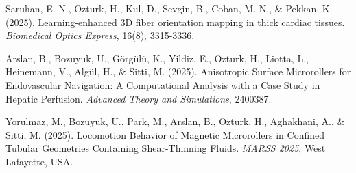 \documentclass{article}
\begin{document}
Saruhan, E. N., Ozturk, H., Kul, D., Sevgin, B., Coban, M. N., \& Pekkan, K. (2025). Learning-enhanced 3D fiber orientation mapping in thick cardiac tissues. \textit{Biomedical Optics Express}, 16(8), 3315-3336.

\vspace{0.5em}

Arslan, B., Bozuyuk, U., Görgülü, K., Yildiz, E., Ozturk, H., Liotta, L., Heinemann, V., Algül, H., \& Sitti, M. (2025). Anisotropic Surface Microrollers for Endovascular Navigation: A Computational Analysis with a Case Study in Hepatic Perfusion. \textit{Advanced Theory and Simulations}, 2400387.

\vspace{0.5em}

Yorulmaz, M., Bozuyuk, U., Park, M., Arslan, B., Ozturk, H., Aghakhani, A., \& Sitti, M. (2025). Locomotion Behavior of Magnetic Microrollers in Confined Tubular Geometries Containing Shear-Thinning Fluids. \textit{MARSS 2025}, West Lafayette, USA.
\end{document}
